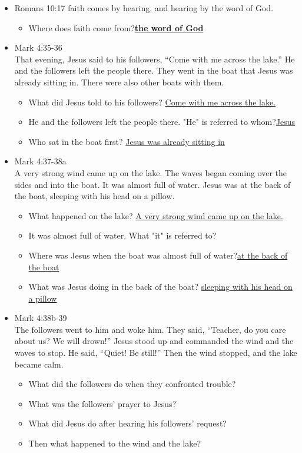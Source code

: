 \begin{itemize}
\item Romans 10:17 faith comes by hearing, and hearing by the word of God.
\begin{itemize}
\item Where does faith come from?\underline{\textbf{the word of God}}
\end{itemize}

\item Mark 4:35-36\\
That evening, Jesus said to his followers, “Come with me across the lake.” He and the followers left the people there. They went in the boat that Jesus was already sitting in. There were also other boats with them. 
\begin{itemize}
\item What did Jesus told to his followers? \underline{Come with me across the lake.}
\item He and the followers left the people there. "He" is referred to whom?\underline{Jesus}
\item Who sat in the boat first? \underline{Jesus was already sitting in}
\end{itemize}


\item Mark 4:37-38a\\ A very strong wind came up on the lake. The waves began coming over the sides and into the boat. It was almost full of water. Jesus was at the back of the boat, sleeping with his head on a pillow. 
\begin{itemize}
\item What happened on the lake? \underline{A very strong wind came up on the lake.}
\item It was almost full of water.  What "it" is referred to?
\item Where was Jesus when the boat was almost full of water?\underline{at the back of the boat}
\item What was Jesus doing in the back of the boat? \underline{sleeping with his head on a pillow}
\end{itemize}


\item Mark 4:38b-39\\The followers went to him and woke him. They said, “Teacher, do you care about us? We will drown!” Jesus stood up and commanded the wind and the waves to stop. He said, “Quiet! Be still!” Then the wind stopped, and the lake became calm.
\begin{itemize}
\item What did the followers do when they confronted trouble? 
\item What was the followers' prayer to Jesus?
\item What did Jesus do after hearing his followers' request?
\item Then what happened to the wind and the lake?
\end{itemize}


\end{itemize}
